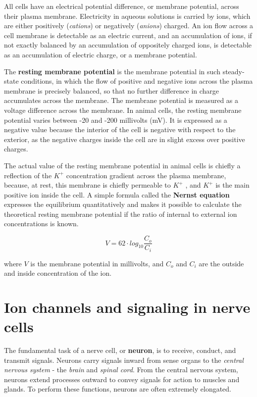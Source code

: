 All cells have an electrical potential difference, or membrane potential,
across their plasma membrane. Electricity in aqueous solutions is carried
by ions, which are either positively (\textit{cations}) or negatively (\textit{anions})
charged. An ion flow across a cell membrane is detectable as an electric
current, and an accumulation of ions, if not exactly balanced by an accumulation
of oppositely charged ions, is detectable as an accumulation of
electric charge, or a membrane potential.

The \textbf{resting membrane potential} is the membrane potential in such steady-state
conditions, in which the flow of positive and negative ions across
the plasma membrane is precisely balanced, so that no further difference
in charge accumulates across the membrane. The membrane potential is
measured as a voltage difference across the membrane. In animal cells,
the resting membrane potential varies between -20 and -200 millivolts
(mV).
It is expressed as a negative value because the interior of the cell is negative with respect to the
exterior, as the negative charges inside the cell are in slight excess over
positive charges. 

The actual value of the resting membrane potential in
animal cells is chiefly a reflection of the $K^{+}$ concentration gradient across
the plasma membrane, because, at rest, this membrane is chiefly permeable
to $K^{+}$ , and $K^{+}$ is the main positive ion inside the cell. A simple
formula called the \textbf{Nernst equation} expresses the equilibrium quantitatively
and makes it possible to calculate the theoretical
resting membrane potential if the ratio of internal to external ion concentrations is known.

\begin{equation}
V = 62 \cdot log_{10} \frac{C_{o}}{C_{i}}
\end{equation}

where $V$ is the membrane potential in millivolts, and $C_o$ and $C_i$ are the outside and inside concentration
of the ion.

\section{Ion channels and signaling in nerve cells}

The fundamental task of a nerve cell, or \textbf{neuron}, is to receive, conduct,
and transmit signals. Neurons carry signals inward from sense organs
to the \textit{central nervous system} - the \textit{brain} and \textit{spinal cord}.
From the central nervous system, neurons extend processes outward to
convey signals for action to muscles and glands. To perform these functions,
neurons are often extremely elongated.

